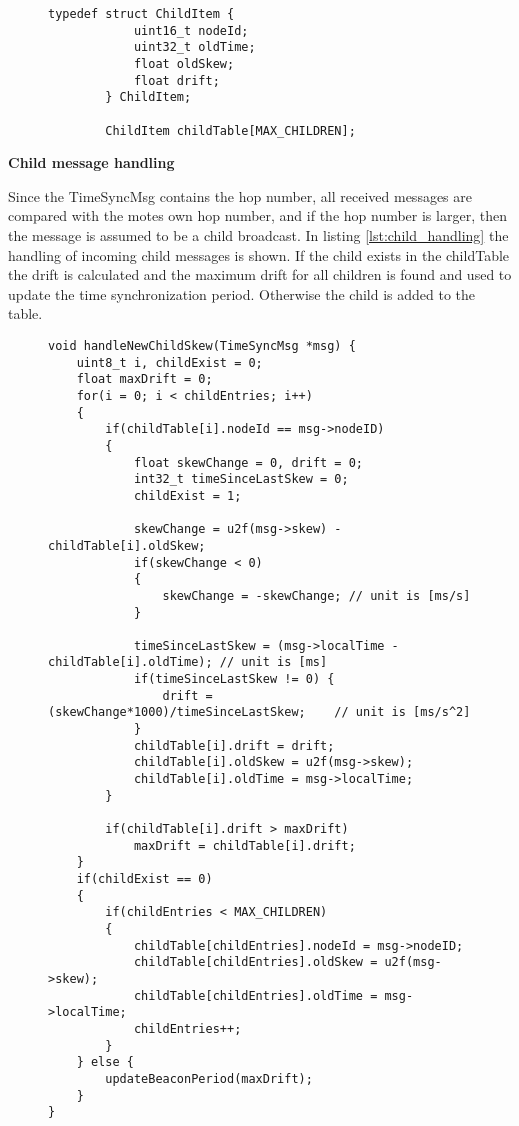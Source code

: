 \documentclass[Main]{subfiles}
\begin{document}
					\begin{figure}[H]
						\begin{lstlisting}[caption=Child table, style=Code-C, label=lst:child_table]
		typedef struct ChildItem {
			uint16_t nodeId;
			uint32_t oldTime;
			float oldSkew;
			float drift;
		} ChildItem;

		ChildItem childTable[MAX_CHILDREN];
			    		\end{lstlisting}
			    	\end{figure}
			    
			    \newpage
			    \textbf{Child message handling}	

			    	Since the TimeSyncMsg contains the hop number, all received messages are compared with the motes own hop number, and if the hop number is larger, then the message is assumed to be a child broadcast.
			    	In listing \ref{lst:child_handling} the handling of incoming child messages is shown.
			    	If the child exists in the childTable the drift is calculated and the maximum drift for all children is found and used to update the time synchronization period.
			    	Otherwise the child is added to the table.
			    	\begin{figure}[H]
						\begin{lstlisting}[caption=Handling incoming child msg, style=Code-C, label=lst:child_handling]
void handleNewChildSkew(TimeSyncMsg *msg) {
	uint8_t i, childExist = 0;
	float maxDrift = 0;
	for(i = 0; i < childEntries; i++)
	{
		if(childTable[i].nodeId == msg->nodeID)
		{
			float skewChange = 0, drift = 0;
			int32_t timeSinceLastSkew = 0;
			childExist = 1;
			
			skewChange = u2f(msg->skew) - childTable[i].oldSkew;				
			if(skewChange < 0)
			{
				skewChange = -skewChange; // unit is [ms/s]
			}
			
			timeSinceLastSkew = (msg->localTime - childTable[i].oldTime); // unit is [ms]
			if(timeSinceLastSkew != 0) {
				drift = (skewChange*1000)/timeSinceLastSkew;	// unit is [ms/s^2]
			}
			childTable[i].drift = drift;
			childTable[i].oldSkew = u2f(msg->skew);
			childTable[i].oldTime = msg->localTime;					
		}
		
		if(childTable[i].drift > maxDrift)
			maxDrift = childTable[i].drift;
	}
	if(childExist == 0)
	{
		if(childEntries < MAX_CHILDREN)
		{
			childTable[childEntries].nodeId = msg->nodeID;
			childTable[childEntries].oldSkew = u2f(msg->skew);
			childTable[childEntries].oldTime = msg->localTime;
			childEntries++;
		}
	} else {
		updateBeaconPeriod(maxDrift);
	}
}

						\end{lstlisting}
			    	\end{figure}
\end{document}
